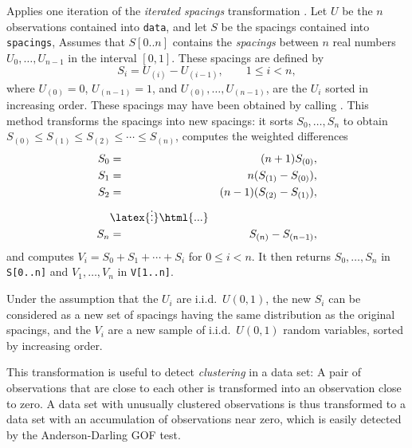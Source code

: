  \begin{tabb} Applies one iteration of the {\em iterated spacings\/}
   transformation \cite{rKNU98a,tSTE86a}.
   Let $U$ be the $n$ observations contained into \texttt{data},
   and let $S$ be the spacings contained into \texttt{spacings},
   Assumes that $S[0..n]$ contains the {\em spacings\/}
   between $n$ real numbers $U_0,\dots,U_{n-1}$ in the interval $[0,1]$.
   These spacings are defined by
    $$ S_i = U_{(i)} - U_{(i-1)},  \qquad  1\le i < n, $$
   where $U_{(0)}=0$, $U_{(n-1)}=1$, and
   $U_{(0)},\dots,U_{(n-1)}$,  are the $U_i$ sorted in increasing order.
   These spacings may have been obtained by calling
   .
   This method transforms the spacings into new
   spacings:
   it sorts $S_0,\dots,S_n$ to obtain
   $S_{(0)} \le S_{(1)} \le S_{(2)} \le \cdots \le S_{(n)}$,
   computes the weighted differences
  \begin {eqnarray*}
    S_{0}   &=& (n+1) S_{(0)}, \\
    S_{1}   &=& n (S_{(1)}-S_{(0)}), \\
    S_{2}   &=& (n-1) (S_{(2)}-S_{(1)}),\\
            & \latex{\vdots}\html{...}& \\
    S_{n}   &=& S_{(n)}-S_{(n-1)},
  \end {eqnarray*}
   and computes $V_i = S_0 + S_1 + \cdots + S_i$ for $0\le i < n$.
   It then returns $S_0,\dots,S_n$ in \texttt{S[0..n]} and
   $V_1,\dots,V_n$ in \texttt{V[1..n]}.

  Under the assumption that the $U_i$ are i.i.d.\ $U (0,1)$, the new
  $S_i$ can be considered as a new set of spacings having the same
  distribution as the original spacings, and the $V_i$ are a new sample
  of i.i.d.\ $U (0,1)$ random variables, sorted by increasing order.

  This transformation is useful to detect {\em clustering\/} in a data
  set: A pair of observations that are close to each other is transformed
  into an observation close to zero.  A data set with unusually clustered
  observations is thus transformed to a data set with an
  accumulation of observations near zero, which is easily detected by
  the Anderson-Darling GOF test.
 \end{tabb}
\begin{htmlonly}
\end{htmlonly}
